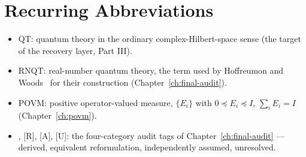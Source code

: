\section{Recurring Abbreviations}
\begin{itemize}
\item[] QT: quantum theory in the ordinary complex-Hilbert-space sense
(the target of the recovery layer, Part III).
\item[] RNQT: real-number quantum theory, the term used by
Hoffreumon and Woods~\cite{hoffreumon-woods-2025} for their construction
(Chapter~\ref{ch:final-audit}).
\item[] POVM: positive operator-valued measure, $\{E_i\}$ with $0\preceq
E_i\preceq I$, $\sum_i E_i=I$ (Chapter~\ref{ch:povm}).
\item[] [D], [R], [A], [U]: the four-category audit tags of
Chapter~\ref{ch:final-audit} — derived, equivalent reformulation,
independently assumed, unresolved.
\end{itemize}
